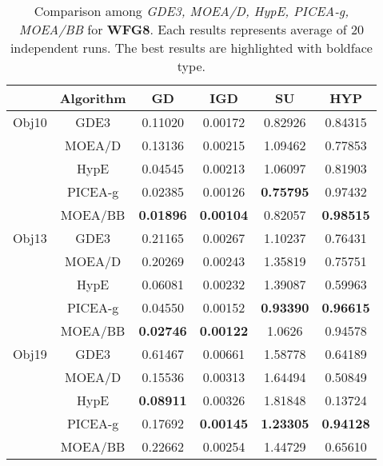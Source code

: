 \begin{center}
\begin{table}[!h]
\label{tab:wfg7}

\end{table}
\begin{table}[!h]
\caption{Comparison among \textit{GDE3, MOEA/D, HypE, PICEA-g, MOEA/BB} for \textbf{WFG8}. Each results represents average of 20 independent runs. The best results are highlighted with boldface type.}
\begin{tabular}{| c | c | c | c | c | c |}

\hline
&\textbf{Algorithm}	&\textbf{GD}&\textbf{IGD}&\textbf{SU}&\textbf{HYP}\\\hline
Obj10	&GDE3		&0.11020			&0.00172			&0.82926			&0.84315\\\cline{2-6}
		&MOEA/D		&0.13136			&0.00215			&1.09462			&0.77853\\\cline{2-6}
		&HypE		&0.04545			&0.00213			&1.06097			&0.81903\\\cline{2-6}
		&PICEA-g	&0.02385			&0.00126			&\textbf{0.75795}	&0.97432\\\cline{2-6}
		&MOEA/BB	&\textbf{0.01896}	&\textbf{0.00104}	&0.82057			&\textbf{0.98515}\\\hline
		
Obj13	&GDE3		&0.21165			&0.00267			&1.10237			&0.76431\\\cline{2-6}
		&MOEA/D		&0.20269			&0.00243			&1.35819			&0.75751\\\cline{2-6}
		&HypE		&0.06081			&0.00232			&1.39087			&0.59963\\\cline{2-6}
		&PICEA-g	&0.04550			&0.00152			&\textbf{0.93390}	&\textbf{0.96615}\\\cline{2-6}
		&MOEA/BB	&\textbf{0.02746}	&\textbf{0.00122}	&1.0626				&0.94578\\\hline					
		
Obj19	&GDE3		&0.61467			&0.00661			&1.58778			&0.64189\\\cline{2-6}
		&MOEA/D		&0.15536			&0.00313			&1.64494			&0.50849\\\cline{2-6}
		&HypE		&\textbf{0.08911}			&0.00326			&1.81848			&0.13724\\\cline{2-6}
		&PICEA-g	&0.17692	&\textbf{0.00145}	&\textbf{1.23305}	&\textbf{0.94128}\\\cline{2-6}
		&MOEA/BB	&0.22662			&0.00254			&1.44729			&0.65610\\
\hline
\end{tabular}

\label{tab:wfg8}


\end{table}
\end{center}
